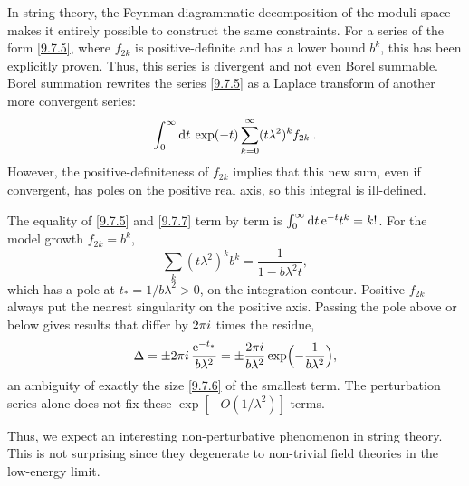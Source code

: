 In string theory, the Feynman diagrammatic decomposition of the moduli space makes it entirely possible to construct the same constraints. For a series of the form \eqref{9.7.5}, where $f_{2 k}$ is positive-definite and has a lower bound $b^{k}$, this has been explicitly proven.
Thus, this series is divergent and not even Borel summable. Borel summation rewrites the series \eqref{9.7.5} as a Laplace transform of another more convergent series:
\begin{equation}
	\int_{0}^{\infty} \mathrm{d} t\: \exp (-t) \sum_{k=0}^{\infty}(t \lambda^{2})^{k} f_{2 k} \:. \label{9.7.7}
\end{equation}
However, the positive-definiteness of $f_{2 k}$ implies that this new sum, even if convergent, has poles on the positive real axis, so this integral is ill-defined.
\begin{tcolorbox}[breakable]
	\begin{remark}
		The equality of \eqref{9.7.5} and \eqref{9.7.7} term by term is $\int_0^\infty\mathrm{d} t\,\mathrm{e}^{-t}t^k=k!$. For the model growth $f_{2k}=b^k$,
		\begin{equation*}
			\sum_k(t\lambda^2)^kb^k=\frac{1}{1-b\lambda^2t},
		\end{equation*}
		which has a pole at $t_*=1/b\lambda^2>0$, on the integration contour. Positive $f_{2k}$ always put the nearest singularity on the positive axis. Passing the pole above or below gives results that differ by $2\pi i$ times the residue,
		\begin{equation*}
			\Delta=\pm2\pi i\,\frac{\mathrm{e}^{-t_*}}{b\lambda^2}=\pm\frac{2\pi i}{b\lambda^2}\exp\Bigl(-\frac{1}{b\lambda^2}\Bigr),
		\end{equation*}
		an ambiguity of exactly the size \eqref{9.7.6} of the smallest term. The perturbation series alone does not fix these $\exp[-O(1/\lambda^2)]$ terms.
	\end{remark}
\end{tcolorbox}
Thus, we expect an interesting non-perturbative phenomenon in string theory. This is not surprising since they degenerate to non-trivial field theories in the low-energy limit.

